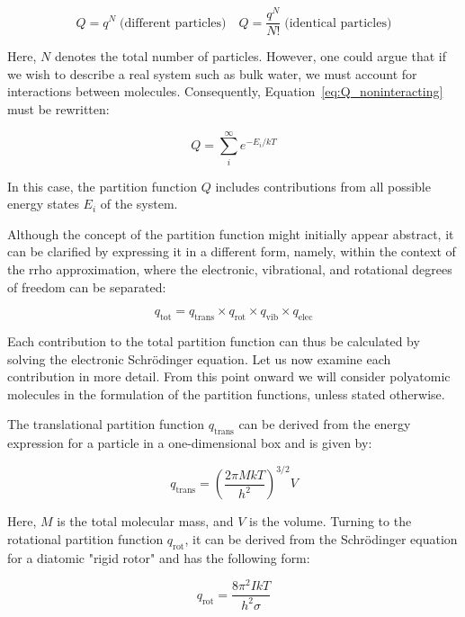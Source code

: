 \begin{equation}
    \label{eq:Q_noninteracting}
    Q = q^N \; \text{(different particles)} \quad Q = \frac{q^N}{N!} \; \text{(identical particles)}
\end{equation}

Here, $N$ denotes the total number of particles. However, one could argue that if we wish to describe a real system such as bulk water, we must account for interactions between molecules. Consequently, Equation~\ref{eq:Q_noninteracting} must be rewritten:

\begin{equation}
Q = \sum_{i}^{\infty} e^{-E_i/kT}
\end{equation}

In this case, the partition function $Q$ includes contributions from all possible energy states $E_i$ of the system.

Although the concept of the partition function might initially appear abstract, it can be clarified by expressing it in a different form, namely, within the context of the \ac{rrho} approximation, where the electronic, vibrational, and rotational degrees of freedom can be separated:

\begin{equation}
    q_{\text{tot}} = q_{\text{trans}} \times q_{\text{rot}} \times q_{\text{vib}} \times q_{\text{elec}}
\end{equation}

Each contribution to the total partition function can thus be calculated by solving the electronic Schr\"odinger equation. Let us now examine each contribution in more detail. From this point onward we will consider polyatomic molecules in the formulation of the partition functions, unless stated otherwise.

The translational partition function $q_\text{trans}$ can be derived from the energy expression for a particle in a one-dimensional box and is given by:

\begin{equation}
    q_{\text{trans}} = \left(\frac{2\pi MkT}{h^2}\right)^{3/2} V
\end{equation}

Here, $M$ is the total molecular mass, and $V$ is the volume. Turning to the rotational partition function $q_\text{rot}$, it can be derived from the Schr\"odinger equation for a diatomic "rigid rotor" and has the following form:

\begin{equation}
    q_{\text{rot}} = \frac{8\pi^2IkT}{h^2\sigma}
\end{equation}

